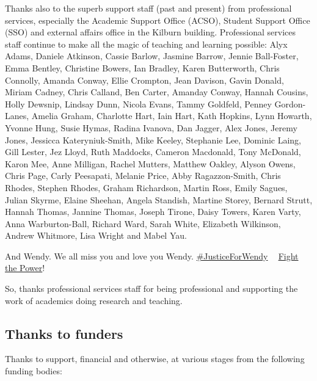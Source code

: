 \documentclass[
]{book}
\begin{document}
Thanks also to the superb support staff (past and present) from professional services, especially the Academic Support Office (ACSO), Student Support Office (SSO) and external affairs office in the Kilburn building. Professional services staff continue to make all the magic of teaching and learning possible: Alyx Adams, Daniele Atkinson, Cassie Barlow, Jasmine Barrow, Jennie Ball-Foster, Emma Bentley, Christine Bowers, Ian Bradley, Karen Butterworth, Chris Connolly, Amanda Conway, Ellie Crompton, Jean Davison, Gavin Donald, Miriam Cadney, Chris Calland, Ben Carter, Amanday Conway, Hannah Cousins, Holly Dewsnip, Lindsay Dunn, Nicola Evans, Tammy Goldfeld, Penney Gordon-Lanes, Amelia Graham, Charlotte Hart, Iain Hart, Kath Hopkins, Lynn Howarth, Yvonne Hung, Susie Hymas, Radina Ivanova, Dan Jagger, Alex Jones, Jeremy Jones, Jessicca Kateryniuk-Smith, Mike Keeley, Stephanie Lee, Dominic Laing, Gill Lester, Jez Lloyd, Ruth Maddocks, Cameron Macdonald, Tony McDonald, Karon Mee, Anne Milligan, Rachel Mutters, Matthew Oakley, Alyson Owens, Chris Page, Carly Peesapati, Melanie Price, Abby Ragazzon-Smith, Chris Rhodes, Stephen Rhodes, Graham Richardson, Martin Ross, Emily Sagues, Julian Skyrme, Elaine Sheehan, Angela Standish, Martine Storey, Bernard Strutt, Hannah Thomas, Jannine Thomas, Joseph Tirone, Daisy Towers, Karen Varty, Anna Warburton-Ball, Richard Ward, Sarah White, Elizabeth Wilkinson, Andrew Whitmore, Lisa Wright and Mabel Yau.

And Wendy. We all miss you and love you Wendy. \href{https://www.justgiving.com/crowdfunding/byte-cafe}{\#JusticeForWendy} ✊🏽 \href{https://en.wikipedia.org/wiki/Fight_the_Power_(Public_Enemy_song)}{Fight the Power}! ✊🏽 \citep{fightthepower}

So, thanks professional services staff for being professional and supporting the work of academics doing research and teaching. 🙏

\hypertarget{funding}{%
\subsection{Thanks to funders}\label{funding}}

Thanks to support, financial and otherwise, at various stages from the following funding bodies:
\end{document}
